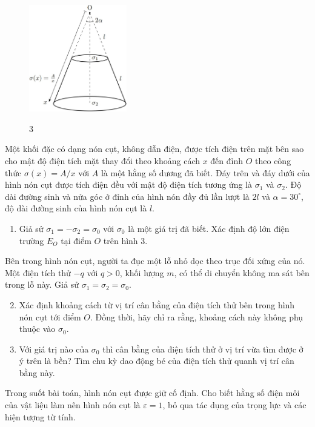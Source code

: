\vspace{-1cm}
\begin{figure}
  \centering
  \includegraphics[width=0.38\textwidth]{Figures/Fig 3.jpg}
  \begin{center}
    \figurename{ 3}
  \end{center}
\end{figure}

\noindent Một khối đặc có dạng nón cụt, không dẫn điện, được tích điện trên mặt bên sao cho mật độ điện tích mặt thay đổi theo khoảng cách $x$ đến đỉnh $O$ theo công thức $\sigma(x)=A/x$ với $A$ là một hằng số dương đã biết. Đáy trên và đáy dưới của hình nón cụt được tích điện đều với mật độ điện tích tương ứng là $\sigma_{1}$ và $\sigma_{2}$. Độ dài đường sinh và nửa góc ở đỉnh của hình nón đầy đủ lần lượt là $2l$ và $\alpha=30^{\circ}$, độ dài đường sinh của hình nón cụt là $l$.
\begin{enumerate}
  \item Giả sử $\sigma_{1}=-\sigma_{2}=\sigma_{0}$ với $\sigma_{0}$ là một giá trị đã biết. Xác định độ lớn điện trường $E_{O}$ tại điểm $O$ trên hình 3.
\end{enumerate}
Bên trong hình nón cụt, người ta đục một lỗ nhỏ dọc theo trục đối xứng của nó. Một điện tích thử $-q$ với $q>0$, khối lượng $m$, có thể di chuyển không ma sát bên trong lỗ này. Giả sử $\sigma_{1}=\sigma_{2}=\sigma_{0}$.
\begin{enumerate}
  \setcounter{enumi}{1}
  \item Xác định khoảng cách từ vị trí cân bằng của điện tích thử bên trong hình nón cụt tới điểm $O$. Đồng thời, hãy chỉ ra rằng, khoảng cách này không phụ thuộc vào $\sigma_{0}$.
  \item Với giá trị nào của $\sigma_{0}$ thì cân bằng của điện tích thử ở vị trí vừa tìm được ở ý trên là bền? Tìm chu kỳ dao động bé của điện tích thử quanh vị trí cân bằng này.
\end{enumerate}
Trong suốt bài toán, hình nón cụt được giữ cố định. Cho biết hằng số điện môi của vật liệu làm nên hình nón cụt là $\varepsilon=1$, bỏ qua tác dụng của trọng lực và các hiện tượng từ tính.\\